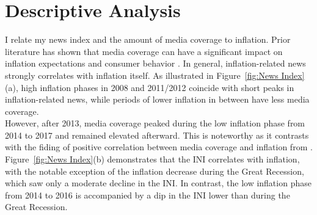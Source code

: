 \documentclass[review]{elsarticle}
\begin{document}
\section{Descriptive Analysis} \label{sec:Descriptive Analysis}
I relate my news index and the amount of media coverage to inflation. Prior literature has shown that media coverage can have a significant impact on inflation expectations and consumer behavior \cite{Carroll2003}. In general, inflation-related news strongly correlates with inflation itself. As illustrated in Figure~\ref{fig:News Index}(a), high inflation phases in 2008 and 2011/2012 coincide with short peaks in inflation-related news, while periods of lower inflation in between have less media coverage. 
\\
However, after 2013, media coverage peaked during the low inflation phase from 2014 to 2017 and remained elevated afterward. This is noteworthy as it contrasts with the fiding of positive correlation between media coverage and inflation from \cite{LamlaLein2014}. Figure~\ref{fig:News Index}(b) demonstrates that the INI correlates with inflation, with the notable exception of the inflation decrease during the Great Recession, which saw only a moderate decline in the INI. In contrast, the low inflation phase from 2014 to 2016 is accompanied by a dip in the INI lower than during the Great Recession.
\end{document}

